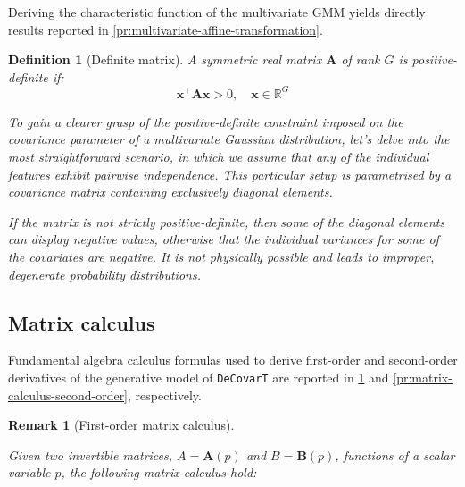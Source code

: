 \documentclass[pdflatex, sn-nature]{sn-jnl}
\theoremstyle{thmstyleone}%
\theoremstyle{thmstyletwo}%
\newtheorem{remark}{Remark}%
\theoremstyle{thmstylethree}%
\newtheorem{definition}{Definition}%
\begin{document}
\begin{appendices}
        Deriving the characteristic function of the multivariate GMM yields
        directly results reported in \ref{pr:multivariate-affine-transformation}.

        \begin{definition}[Definite matrix]
            \label{def:positive-definite} A symmetric real matrix $\boldsymbol{A}$
            of rank $G$ is \textit{positive-definite} if:
            \begin{equation}
                \label{eq-positive-definite}\boldsymbol{x}^{\top} \boldsymbol{A}\boldsymbol
                {x}> 0, \quad \boldsymbol{x}\in \mathbb{R}^{G}
            \end{equation}

            To gain a clearer grasp of the positive-definite constraint imposed
            on the covariance parameter of a multivariate Gaussian distribution,
            let's delve into the most straightforward scenario, in which we
            assume that any of the individual features exhibit pairwise
            independence. This particular setup is parametrised by a covariance matrix
            containing exclusively diagonal elements.

            If the matrix is not strictly positive-definite, then some of the
            diagonal elements can display negative values, otherwise that the individual
            variances for some of the covariates are negative. It is not
            physically possible and leads to improper, degenerate probability distributions.
        \end{definition}

        \clearpage

        \subsection{Matrix calculus}
        \label{subsec:matrix-calculus}

        Fundamental algebra calculus formulas used to derive first-order and second-order
        derivatives of the generative model of \texttt{DeCovarT} are reported in
        \ref{pr:matrix-calculus-first-order} and
        \ref{pr:matrix-calculus-second-order}, respectively.

        \begin{remark}[First-order matrix calculus]
            \label{pr:matrix-calculus-first-order}

            Given two invertible matrices, $A=\boldsymbol{A}(p)$ and $B=\boldsymbol
            {B}(p)$, functions of a scalar variable $p$, the following matrix calculus
            hold:


\end{remark}
\end{appendices}
\end{document}
